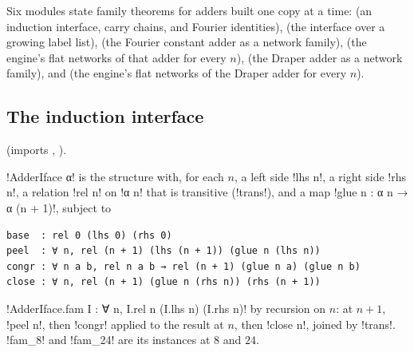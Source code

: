 {Six modules state family theorems for adders built one copy at a time:  (an induction interface, carry chains, and Fourier identities),  (the interface over a growing label list),  (the Fourier constant adder as a network family),  (the engine's flat networks of that adder for every $n$),  (the Draper adder as a network family), and  (the engine's flat networks of the Draper adder for every $n$).

\subsection{The induction interface}

 (imports , ).

\begin{definition}\label{def:boxes-adderIface}
\lbx!AdderIface α! is the structure with, for each $n$, a left side \lbx!lhs n!, a right side \lbx!rhs n!, a relation \lbx!rel n! on \lbx!α n! that is transitive (\lbx!trans!), and a map \lbx!glue n : α n → α (n + 1)!, subject to
\begin{lstlisting}[style=leanbox]
base  : rel 0 (lhs 0) (rhs 0)
peel  : ∀ n, rel (n + 1) (lhs (n + 1)) (glue n (lhs n))
congr : ∀ n a b, rel n a b → rel (n + 1) (glue n a) (glue n b)
close : ∀ n, rel (n + 1) (glue n (rhs n)) (rhs (n + 1))
\end{lstlisting}
\lbx!AdderIface.fam I : ∀ n, I.rel n (I.lhs n) (I.rhs n)! by recursion on $n$: at $n+1$, \lbx!peel n!, then \lbx!congr! applied to the result at $n$, then \lbx!close n!, joined by \lbx!trans!. \lbx!fam_8! and \lbx!fam_24! are its instances at $8$ and $24$.
\end{definition}

}
